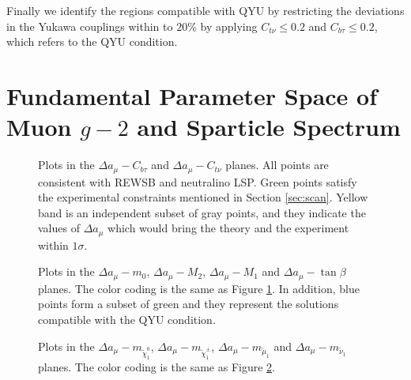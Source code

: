 \documentclass[12pt]{article}
\begin{document}
Finally we identify the regions compatible with QYU by restricting the deviations in the Yukawa couplings within to $20\%$ by applying $C_{t\nu} \leq 0.2$ and $C_{b\tau}\leq 0.2$, which refers to the QYU condition.

\section{Fundamental Parameter Space of Muon $g-2$ and Sparticle Spectrum}
\label{sec:res}

\begin{figure}[ht!]
\centering
{}
\caption{Plots in the $\Delta a_{\mu}-C_{b\tau}$ and $\Delta a_{\mu}-C_{t\nu}$ planes. All points are consistent with REWSB and neutralino LSP. Green points satisfy the experimental constraints mentioned in Section \ref{sec:scan}. Yellow band is an independent subset of gray points, and they indicate the values of $\Delta a_{\mu}$ which would bring the theory and the experiment within $1\sigma$.}
\label{fig2}
\end{figure}

\begin{figure}[ht!]
\centering
{}
\caption{Plots in the $\Delta a_{\mu}-m_{0}$, $\Delta a_{\mu}-M_{2}$, $\Delta a_{\mu}-M_{1}$ and $\Delta a_{\mu}-\tan\beta$ planes. The color coding is the same as Figure \ref{fig2}. In addition, blue points form a subset of green and they represent the solutions compatible with the QYU condition.}
\label{fig3}
\end{figure}

\begin{figure}[ht!]
\centering
{}
\caption{Plots in the $\Delta a_{\mu}-m_{\tilde{\chi}_{1}^{0}}$, $\Delta a_{\mu}-m_{\tilde{\chi}_{1}^{\pm}}$, $\Delta a_{\mu}-m_{\tilde{\mu}_{1}}$ and $\Delta a_{\mu}-m_{\tilde{\nu}_{1}}$ planes. The color coding is the same as Figure \ref{fig3}.}
\label{fig4}
\end{figure}
\end{document}

